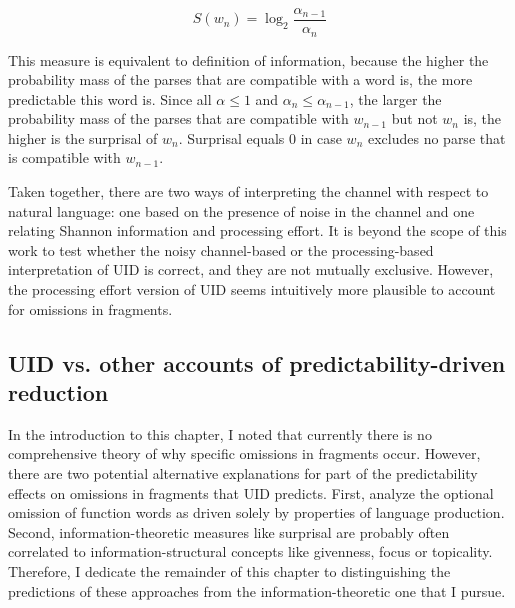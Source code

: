 \begin{equation}
 \displaystyle S(w_n) = \log_2 \frac{\alpha_{n-1}}{\alpha_n} \label{eq:surprisalhale}
\end{equation}

This measure is equivalent to  definition of information, because the higher the probability mass of the parses that are compatible with a word is, the more predictable this word is. Since all $\alpha\leq1$ and $\alpha_n\leq\alpha_{n-1}$, the larger the probability mass of the parses that are compatible with $w_{n-1}$ but not $w_n$ is, the higher is the surprisal of $w_n$. Surprisal equals 0 in case $w_n$ excludes no parse that is compatible with $w_{n-1}$.

Taken together, there are two ways of interpreting the channel with respect to natural language: one based on the presence of noise in the channel and one relating Shannon information and processing effort. It is beyond the scope of this work to test whether the noisy channel-based or the processing-based interpretation of UID is correct, and they are not mutually exclusive. However, the processing effort version of UID seems intuitively more plausible to account for omissions in fragments.

\subsection{UID vs. other accounts of predictability-driven reduction}
\label{sec:infotheory-uid-competing}
In the introduction to this chapter, I noted that currently there is no comprehensive theory of why specific omissions in fragments occur. However, there are two potential alternative explanations for part of the predictability effects on omissions in fragments that UID predicts. First, \citet{ferreira.dell2000} analyze the optional omission of function words as driven solely by properties of language production. Second, information-theoretic measures like surprisal are probably often correlated to information-structural concepts like givenness, focus or topicality. Therefore, I dedicate the remainder of this chapter to distinguishing the predictions of these approaches from the information-theoretic one that I pursue. 

